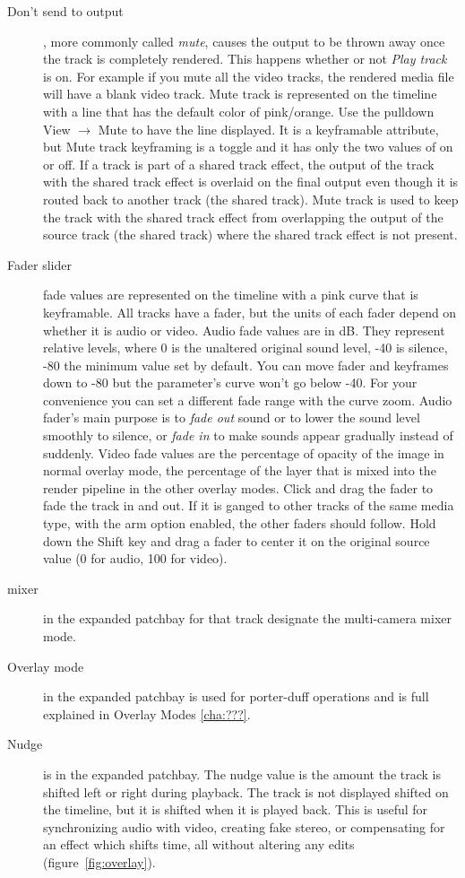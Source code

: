 \begin{description}
    \item[Don’t send to output] , more commonly called \textit{mute}, causes the output to be thrown away once the track is completely rendered. This happens whether or not \textit{Play track} is on.  For example if you mute all the video tracks, the rendered media file will have a blank video track.  Mute track is represented on the timeline with a line that has the default color of pink/orange.  Use the pulldown View $\rightarrow$ Mute to have the line displayed.  It is a keyframable attribute, but Mute track keyframing is a toggle and it has only the two values of on or off. If a track is part of a shared track effect, the output of the track with the shared track effect is overlaid on the final output even though it is routed back to another track (the shared track).  Mute track is used to keep the track with the shared track effect from overlapping the output of the source track (the shared track) where the shared track effect is not present.
    \item[Fader slider] fade values are represented on the timeline with a pink curve that is keyframable.  All tracks have a fader, but the units of each fader depend on whether it is audio or video.  Audio fade values are in dB. They represent relative levels, where 0 is the unaltered original sound level, -40 is silence, -80 the minimum value set by default.  You can move fader and keyframes down to -80 but the parameter's curve won't go below -40.  For your convenience you can set a different fade range with the curve zoom.  Audio fader’s main purpose is to \textit{fade out} sound or to lower the sound level smoothly to silence, or \textit{fade in} to make sounds appear gradually instead of suddenly.  Video fade values are the percentage of opacity of the image in normal overlay mode, the percentage of the layer that is mixed into the render pipeline in the other overlay modes.
    Click and drag the fader to fade the track in and out.  If it is ganged to other tracks of the same media type, with the arm option enabled, the other faders should follow.  Hold down the Shift key and drag a fader to center it on the original source value (0 for audio, 100 for video).
    \item[mixer] in the expanded patchbay for that track designate the multi-camera mixer mode.
    \item[Overlay mode] in the expanded patchbay is used for porter-duff operations and is full explained in Overlay Modes \ref{cha:???}.
    \item[Nudge] is in the expanded patchbay.  The nudge value is the amount the track is shifted left or right during playback. The track is not displayed shifted on the timeline, but it is shifted when it is played back. This is useful for synchronizing audio with video, creating fake stereo, or compensating for an effect which shifts time, all without altering any edits (figure~\ref{fig:overlay}).
    

\end{description}
